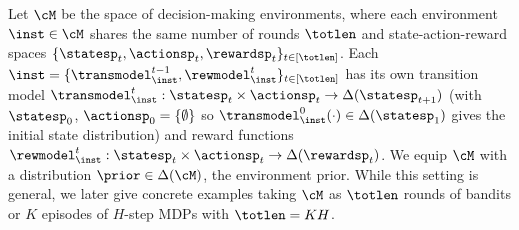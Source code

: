 \documentclass[10pt]{article}
\begin{document}
Let $\cM$ be the space of decision-making environments, where each environment $\inst \in \cM$ shares the same number of rounds $\totlen$ and state-action-reward spaces $\{ \statesp_t,  \actionsp_t, \rewardsp_t \}_{t \in [\totlen]}$. Each $\inst = \{\transmodel_\inst^{t-1}, \rewmodel_\inst^t \}_{t \in [\totlen]}$ has its own transition model $\transmodel_\inst^t: \statesp_{t} \times \actionsp_{t} \to \Delta(\statesp_{t+1})$ (with $\statesp_0$, $\actionsp_0 = \{ \emptyset \}$ so $\transmodel_\inst^0(\cdot) \in \Delta(\statesp_1)$ gives the initial state distribution) and reward functions $\rewmodel_\inst^{t}: \statesp_{t} \times \actionsp_{t} \to \Delta(\rewardsp_t)$. We equip $\cM$ with a distribution $\prior \in \Delta(\cM)$, the environment prior. While this setting is general, we later give concrete examples taking $\cM$ as $\totlen$ rounds of bandits or $K$ episodes of $H$-step MDPs with $\totlen = K H$. 
\end{document}
